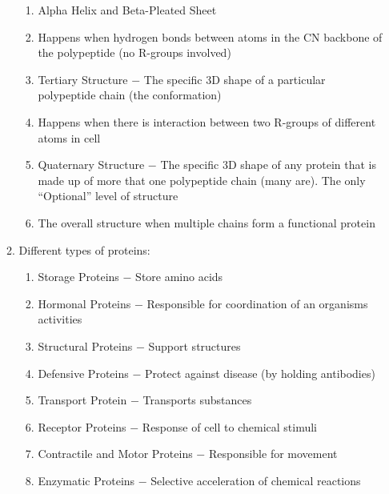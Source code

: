 \documentclass[12pt]{article}
\begin{document}
\begin{itemize}
\begin{enumerate}
\begin{enumerate}
          \item Alpha Helix and Beta-Pleated Sheet

          \item Happens when hydrogen bonds between atoms in the CN backbone of the polypeptide (no R-groups involved)

          \item Tertiary Structure $-$ The specific 3D shape of a particular polypeptide chain (the conformation)

          \item Happens when there is interaction between two R-groups of different atoms in cell
            
          \item Quaternary Structure $-$ The specific 3D shape of any protein that is made up of more that one polypeptide chain (many are). The only ``Optional'' level of structure

          \item The overall structure when multiple chains form a functional protein

          \end{enumerate}

        \item Different types of proteins:

          \begin{enumerate}

            \item Storage Proteins $-$ Store amino acids

            \item Hormonal Proteins $-$ Responsible for coordination of an organisms activities

            \item Structural Proteins $-$ Support structures

            \item Defensive Proteins $-$ Protect against disease (by holding antibodies)

            \item Transport Protein $-$ Transports substances

            \item Receptor Proteins $-$ Response of cell to chemical stimuli

            \item Contractile and Motor Proteins $-$ Responsible for movement

            \item Enzymatic Proteins $-$ Selective acceleration of chemical reactions


\end{enumerate}
\end{enumerate}
\end{itemize}
\end{document}
